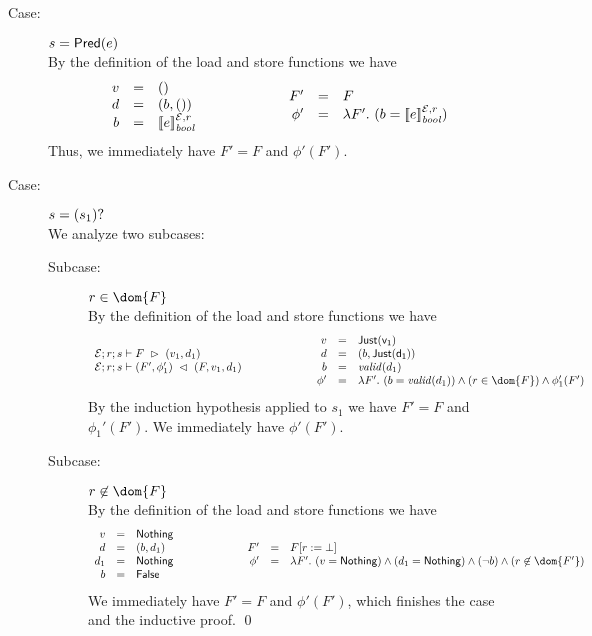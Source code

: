 {\begin{description}
\item[Case:] $s = \mathsf{Pred}(e)$\\[1ex]
%
By the definition of the load and store functions we have
\[
\begin{array}{rcl}
v &=& ()\\
d &=& (b,())\\
b &=& [\![e]\!]^{\mathcal{E},r}_{\mathit{bool}}\\
\end{array}\hspace*{2cm}\begin{array}{rcl}
F' &=& F\\
\phi' &=& \lambda F'.~(b = [\![e]\!]^{\mathcal{E},r}_{\mathit{bool}})\\
\end{array}
\]
Thus, we immediately have $F' = F$ and $\phi'(F')$.

\item[Case:] $s = (s_1)?$\\[1ex]
%
We analyze two subcases:
\begin{description}
\item[Subcase:] $r \in \dom{F}$\\[1ex]
%
By the definition of the load and store functions we have
\[ 
\begin{array}{l}
\load{\Env}{F}{r}{s}{v_1,d_1}\\
\store{\Env}{F}{r}{v_1,d_1}{s}{ F',\phi_1' }\\
\end{array}\hspace*{2cm}\begin{array}{rcl}
v &=& \Just{v_1}\\
d &=& (b,\Just{d_1})\\
b &=& \valid{d_1}\\
\phi' &=& \lambda F'.~(b = \valid{d_1}) \wedge (r \in \dom{F}) \wedge \phi_1'(F')\\
\end{array}
\]
%
By the induction hypothesis applied to $s_1$ we have $F' = F$ and
$\phi_1'(F')$. We immediately have $\phi'(F')$.

\item[Subcase:] $r \not\in \dom{F}$\\[1ex]
%
By the definition of the load and store functions we have 
\[ 
\begin{array}{rcl}
v &=& \Nothing\\
d &=& (b,d_1)\\
d_1 &=& \Nothing\\
b &=& \False\\
\end{array}\hspace*{2cm}\begin{array}{rcl}
F' &=& \FDelete{F}{r}\\
\phi' &=& \lambda F'.~(v = \Nothing) \wedge (d_1 = \Nothing) \wedge (\neg b) \wedge  (r \not\in \dom{F'})
\end{array}
\]
We immediately have $F' = F$ and $\phi'(F')$, which finishes the case
and the inductive proof. \hfill \qed
\end{description}
\end{description}
}

